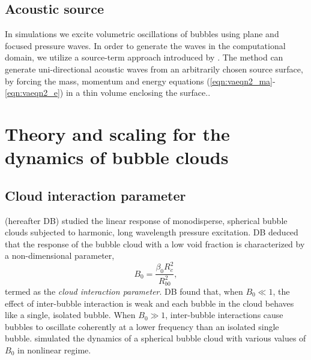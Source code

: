 \documentclass{jfm}
\begin{document}
\subsection{Acoustic source}
In simulations we excite volumetric oscillations of bubbles using plane and focused pressure waves.
In order to generate the waves in the computational domain, we utilize a source-term approach introduced by \cite{Maeda17}.
The method can generate uni-directional acoustic waves from an arbitrarily chosen source surface, by forcing the mass, momentum and energy equations (\ref{eqn:vaeqn2_ma}-\ref{eqn:vaeqn2_e}) in a thin volume enclosing the surface..

\section{Theory and scaling for the dynamics of bubble clouds}
\label{section:metrics}
\subsection{Cloud interaction parameter}
\citet{dAgostino89} (hereafter DB) studied the linear response of monodisperse, spherical bubble clouds subjected to harmonic, long wavelength pressure excitation.
DB deduced that the response of the bubble cloud with a low void fraction is characterized by a non-dimensional parameter,
\begin{equation}
B_0=\frac{\beta_0R^2_c}{R^2_{b0}},\label{eqn:DB}
\end{equation}
termed as the {\itshape{cloud interaction parameter}}.
DB found that, when $B_0\ll 1$, the effect of inter-bubble interaction is weak and each bubble in the cloud behaves like a single, isolated bubble. When $B_0\gg 1$, inter-bubble interactions cause bubbles to oscillate coherently at a lower frequency than an isolated single bubble.
\citet{Wang99} simulated the dynamics of a spherical bubble cloud with various values of $B_0$ in nonlinear regime.
\end{document}
